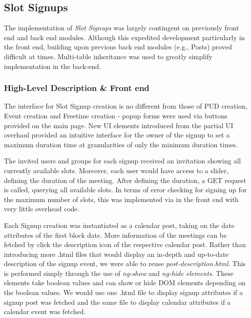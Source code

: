 \documentclass[a4paper]{article}
\begin{document}
\subsection{Slot Signups}

The implementation of \emph{Slot Signups} was largely contingent on previously front end and back end modules. Although this expedited development particularly in the front end, building upon previous back end modules (e.g., Posts) proved difficult at times. Multi-table inheritance was used to greatly simplify implementation in the back-end.

\subsubsection{High-Level Description \& Front end}

The interface for Slot Signup creation is no different from those of PUD creation, Event creation and Freetime creation - popup forms were used via buttons provided on the main page. New UI elements introduced from the partial UI overhaul provided an intuitive interface for the owner of the signup to set a maximum duration time at granularities of only the minimum duration times.

The invited users and groups for each signup received an invitation showing all currently available slots. Moreover, each user would have access to a slider, defining the duration of the meeting. After defining the duration, a GET request is called, querying all available slots. In terms of error checking for signing up for the maximum number of slots, this was implemented via in the front end with very little overhead code. 

Each Signup creation was instantiated as a calendar post, taking on the date attributes of the first block date. More information of the meetings can be fetched by click the description icon of the respective calendar post. Rather than introducing more .html files that would display an in-depth and up-to-date description of the signup event, we were able to reuse \textit{post-description.html}. This is performed simply through the use of \textit{ng-show} and \textit{ng-hide elements}. These elements take boolean values and can show or hide DOM elements depending on the boolean values. We would use one .html file to display signup attributes if a signup post was fetched and the same file to display calendar attributes if a calendar event was fetched.
\end{document}
